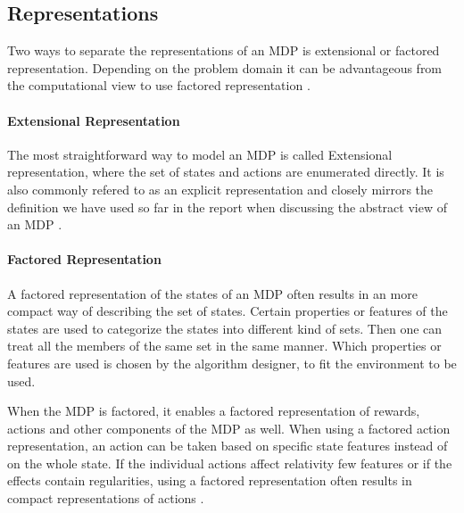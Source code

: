\subsection{Representations }
Two ways to separate the representations of an MDP is extensional or factored representation. Depending on the problem domain it can be advantageous from the computational view to use factored representation \parencite{dean1999descision}.

\paragraph{Extensional Representation }
The most straightforward way to model an MDP is called Extensional representation, where the set of states and actions are enumerated directly. It is also commonly refered to as an explicit representation and closely mirrors the definition we have used so far in the report when discussing the abstract view of an MDP \parencite{dean1999descision}.

\paragraph{Factored Representation } 
A factored representation of the states of an MDP often results in an more compact way of describing the set of states. Certain properties or features of the states are used to categorize the states into different kind of sets. Then one can treat all the members of the same set in the same manner. Which properties or features are used is chosen by the algorithm designer, to fit the environment to be used. 

When the MDP is factored, it enables a factored representation of rewards, actions and other components of the MDP as well. When using a factored action representation, an action can be taken based on specific state features instead of on the whole state. If the individual actions affect relativity few features or if the effects contain regularities, using a factored representation often results in compact representations of actions \parencite{dean1999descision}. 
